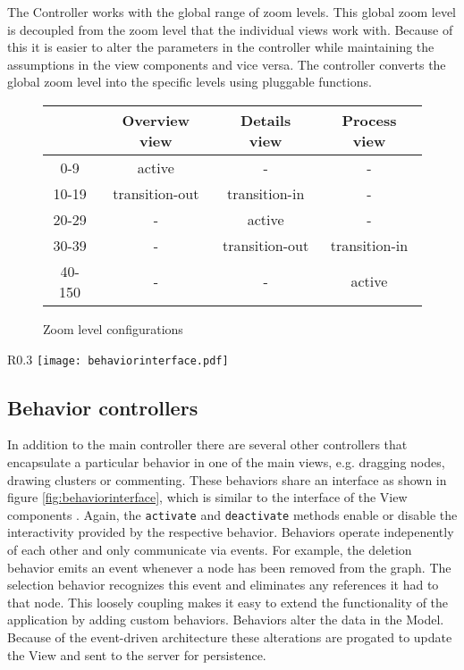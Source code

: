 The Controller works with the global range of zoom levels. This global zoom level is decoupled from the zoom level that the individual views work with. Because of this it is easier to alter the parameters in the controller while maintaining the assumptions in the view components and vice versa. The controller converts the global zoom level into the specific levels using pluggable functions.

\begin{figure}
\begin{center}
\begin{tabular}{ c | c | c | c }
\hline
& Overview view & Details view & Process view \\ \hline
0-9 & active & - & - \\
10-19 & transition-out & transition-in & - \\
20-29 & - & active & - \\
30-39 & - & transition-out & transition-in \\
40-150 & - & - & active \\ \hline
\end{tabular}
\end{center}
\caption{Zoom level configurations}
\label{fig:zoomtable}
\end{figure}

\begin{wrapfigure}{R}{0.3\textwidth}
\texttt{[image: behaviorinterface.pdf]}
\caption{Class diagram of the Behavior interface}
\label{fig:behaviorinterface}
\end{wrapfigure}

\subsection{Behavior controllers}
\label{sec:behavior}

In addition to the main controller there are several other controllers that encapsulate a particular behavior in one of the main views, e.g. dragging nodes, drawing clusters or commenting. These behaviors share an interface as shown in figure \ref{fig:behaviorinterface}, which is similar to the interface of the View components . Again, the \texttt{activate} and \texttt{deactivate} methods enable or disable the interactivity provided by the respective behavior. Behaviors operate indepenently of each other and only communicate via events. For example, the deletion behavior emits an event whenever a node has been removed from the graph. The selection behavior recognizes this event and eliminates any references it had to that node. This loosely coupling makes it easy to extend the functionality of the application by adding custom behaviors. Behaviors alter the data in the Model. Because of the event-driven architecture these alterations are progated to update the View and sent to the server for persistence.



